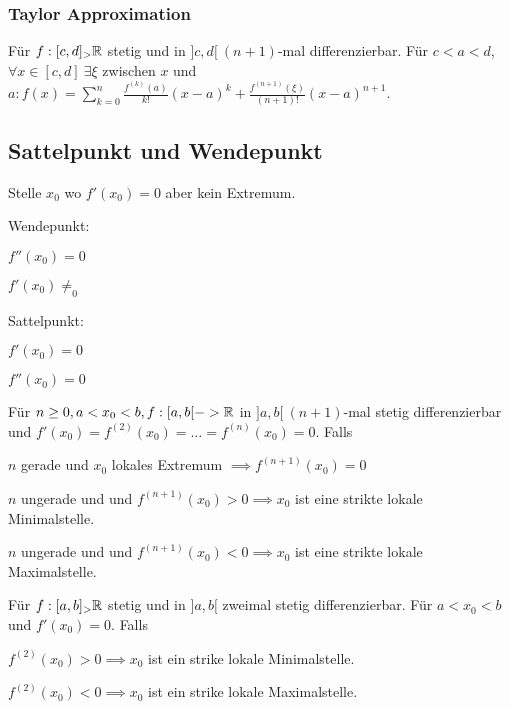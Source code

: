 \subsubsection{Taylor Approximation}
Für $f:[c,d] _> \mathbb{R}$ stetig und in $]c, d[ \ (n+1)$-mal differenzierbar. Für $c < a < d$, $\forall x \in [c, d] \ \exists \xi$ zwischen $x$ und $a: f(x) = \sum_{k=0}^{n} \frac{f^{(k)}(a)}{k!}(x-a)^k + \frac{f^{(n+1)}(\xi)}{(n+1)!}(x-a)^{n+1}$.

\subsection{Sattelpunkt und Wendepunkt}
Stelle $x_0$ wo $f'(x_0)=0$ aber kein Extremum.
\begin{compactdesc}
    \item[Wendepunkt:]
        \begin{inparaitem}
            \item $f''(x_0)=0$
            \item $f'(x_0)\neq_0$
        \end{inparaitem}
    \item[Sattelpunkt:]
        \begin{inparaitem}
            \item $f'(x_0) = 0$ 
            \item $f''(x_0) = 0$
        \end{inparaitem}
\end{compactdesc}

Für $n \ge 0, a < x_0 < b, f:[a,b[ -> \mathbb{R}$ in $]a,b[ \ (n+1)$-mal stetig differenzierbar und $f'(x_0) = f^{(2)}(x_0) = \dots = f^{(n)}(x_0) = 0$. Falls
\begin{compactenum}
    \item $n$ gerade und $x_0$ lokales Extremum $\implies f^{(n+1)}(x_0) = 0$
    \item $n$ ungerade und und $f^{(n+1)}(x_0) > 0 \implies x_0$ ist eine strikte lokale Minimalstelle.
    \item $n$ ungerade und und $f^{(n+1)}(x_0) < 0 \implies x_0$ ist eine strikte lokale Maximalstelle.
\end{compactenum}

Für $f:[a,b] _> \mathbb{R}$ stetig und in $]a,b[$ zweimal stetig differenzierbar. Für $a < x_0 < b$ und $f'(x_0) = 0$. Falls
\begin{compactenum}
    \item $f^{(2)}(x_0) > 0 \implies x_0$ ist ein strike lokale Minimalstelle.
    \item $f^{(2)}(x_0) < 0 \implies x_0$ ist ein strike lokale Maximalstelle.
\end{compactenum}
